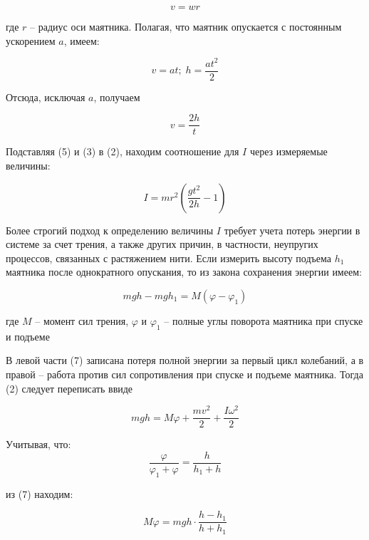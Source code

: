 \documentclass[a4paper]{article}
\begin{document}
\begin{equation}
v=wr
\end{equation}

где $r$ – радиус оси маятника. Полагая, что маятник опускается
с постоянным ускорением $a$, имеем:

\begin{equation}
    v=at; \; h=\dfrac{at^2}{2}
\end{equation}

Отсюда, исключая $a$, получаем

\begin{equation}
    v=\dfrac{2h}{t}
\end{equation}


Подставляя (5) и (3) в (2), находим соотношение для $I$ через измеряемые величины:

\begin{equation}
    I=mr^2\left(\dfrac{gt^2}{2h}-1\right)
\end{equation}


Более строгий подход к определению величины $I$ требует учета потерь энергии в системе за счет трения, а также других причин, в частности, неупругих процессов, связанных с растяжением
нити. Если измерить высоту подъема $h_1$ маятника после однократного опускания, то из закона сохранения энергии имеем:

\begin{equation}
    mgh-mgh_1=M(\varphi-\varphi_1)
\end{equation}


где $M$ – момент сил трения, $\varphi$ и $\varphi_1$ – полные углы поворота маятника при спуске и подъеме


В левой части (7) записана потеря полной энергии за первый
цикл колебаний, а в правой – работа против сил сопротивления
при спуске и подъеме маятника. Тогда (2) следует переписать ввиде

\begin{equation}
    mgh=M\varphi+\dfrac{mv^2}{2}+\dfrac{I\omega^2}{2}
\end{equation}

Учитывая, что:
\begin{equation}
    \dfrac{\varphi}{\varphi_1+\varphi}=\dfrac{h}{h_1+h}
\end{equation}

из (7) находим:

\begin{equation}
    M\varphi=mgh\cdot\dfrac{h-h_1}{h+h_1}
\end{equation}
\end{document}
